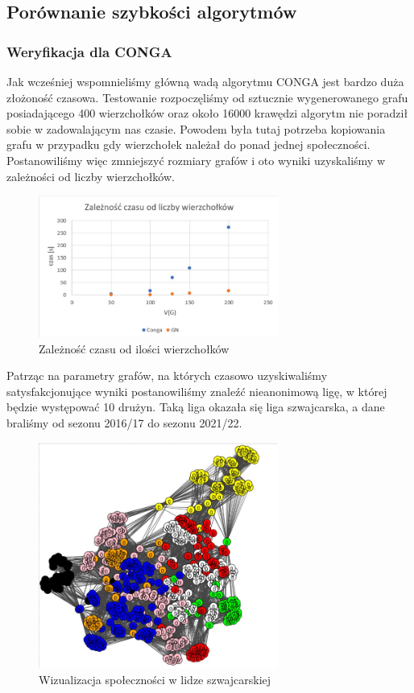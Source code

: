 \documentclass{article}
\begin{document}
\subsection{Porównanie szybkości algorytmów}

\subsubsection{Weryfikacja dla CONGA}
Jak wcześniej wspomnieliśmy główną wadą algorytmu CONGA jest bardzo duża złożoność czasowa. Testowanie rozpoczęliśmy od sztucznie wygenerowanego grafu posiadającego 400 wierzchołków oraz około 16000 krawędzi algorytm nie poradził sobie w zadowalającym nas czasie. Powodem była tutaj potrzeba kopiowania grafu w przypadku gdy wierzchołek należał do ponad jednej społeczności. Postanowiliśmy więc zmniejszyć rozmiary grafów i oto wyniki uzyskaliśmy w zależności od liczby wierzchołków.

\begin{figure}[H]
    \centering
    \includegraphics[width=0.7\textwidth]{images/wyk1.png}
    \caption{Zależność czasu od ilości wierzchołków}
    \label{fig:my_label}
\end{figure}

Patrząc na parametry grafów, na których czasowo uzyskiwaliśmy satysfakcjonujące wyniki postanowiliśmy znaleźć nieanonimową ligę, w której będzie występować 10 drużyn. Taką liga okazała się liga szwajcarska, a dane braliśmy od sezonu 2016/17 do sezonu 2021/22. 

\begin{figure}[H]
    \centering
    \includegraphics[width=0.7\textwidth]{images/lpa1.png}
    \caption{Wizualizacja społeczności w lidze szwajcarskiej}
    \label{fig:my_label}
\end{figure}
\end{document}
